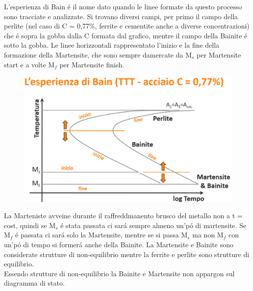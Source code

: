 \documentclass{article}
\begin{document}
{\begin{figure}[h!]
            \end{figure}
            L'esperienza di Bain \'e il nome dato quando le linee formate da questo processo sono tracciate e analizzate.  Si trovano diversi campi, per primo il campo della perlite (nel caso di C = 0,77$\%$, ferrite e cementite anche a diverse concentrazioni) che \'e sopra la gobba dalla C formata dal grafico, mentre il campo della Bainite \'e sotto la gobba. Le linee horizzontali rappresentato l'inizio e la fine della formazione della Martensite, che sono sempre damercate da M$_s$ per Martensite start e a volte M$_f$ per Martensite finish.\\
            \begin{figure}[h!]
                \centering
                \includegraphics[width=.75\linewidth]{Metallurgia/L15 - TTT per C77.png}
            \end{figure}
            La Marteniste avveine durante il raffreddmanento brusco del metallo non a t = cost, quindi se M$_s$ \'e stata passata ci sar\'a sempre almeno un'p\'o di martensite. Se M$_f$ \'e passata ci sar\'a solo la Martensite, mentre se si passa M$_s$ ma non M$_f$ con un'p\'o di tempo si former\'a anche della Bainite.
            La Martensite e Bainite sono considerate strutture di non-equilibrio mentre la ferrite e perlite sono strutture di equilibrio.\\
            Essendo strutture di non-equilibrio la Bainite e Martensite non appargon sul diagramma di stato.
}
\end{document}
